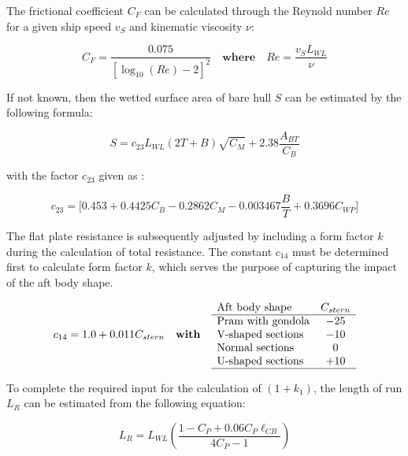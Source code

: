 The frictional coefficient $C_F$ can be calculated through the Reynold number $Re$ for a given ship speed $v_{S}$ and kinematic viscosity $\nu$:

\begin{equation}\label{eqn:C_F}
    C_F = \frac{0.075}{[\log_{10}(Re)-2]^2} \quad \textbf{where} \quad Re = \frac{v_{S}L_{WL}}{\nu}
\end{equation}

If not known, then the wetted surface area of bare hull $S$ can be estimated by the following formula:

\begin{equation}\label{eqn:S_bh}
    S = c_{23}L_{WL}(2T+B)\sqrt{C_M}+2.38\frac{A_{BT}}{C_B}
\end{equation}

with the factor $c_{23}$ given as :

\begin{equation}\label{eqn:c_23}
    c_{23} = \biggl[0.453 + 0.4425C_B - 0.2862C_M - 0.003467\frac{B}{T} + 0.3696C_{WP} \biggr]
\end{equation}

The flat plate resistance is subsequently adjusted by including a form factor $k$ during the calculation of total resistance. The constant $c_{14}$ must be determined first to calculate form factor $k$, which serves the purpose of capturing the impact of the aft body shape.   

\begin{equation}\label{eqn:c_14}
    c_{14} = 1.0 + 0.011C_{stern} \quad \textbf{with} \quad \begin{array}{l c}
        \text{Aft body shape} & C_{stern}\\
        \hline
        \text{Pram with gondola} & -25 \\
        \text{V-shaped sections} & -10 \\
        \text{Normal sections} & 0 \\
        \text{U-shaped sections} & +10 \\
        \hline
    \end{array}
\end{equation}

To complete the required input for the calculation of $(1+k_1)$, the length of run $L_R$ can be estimated from the following equation:

\begin{equation}\label{eqn:L_R}
    L_R = L_{WL}(\frac{1-C_P+0.06C_P\ell_{CB}}{4C_P-1})
\end{equation}

